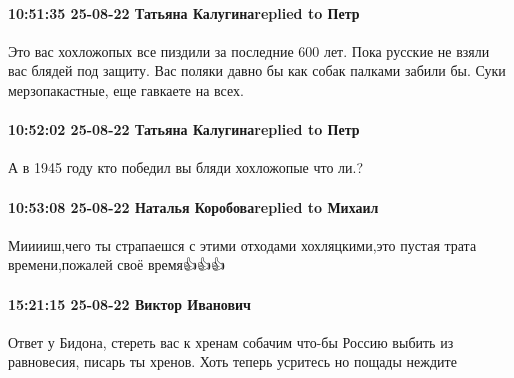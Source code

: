 \paragraph{10:51:35 25-08-22 Татьяна Калугинаreplied to Петр}

Это вас хохложопых все пиздили за последние 600 лет. Пока русские не взяли вас
блядей под защиту. Вас поляки давно бы как собак палками забили бы. Суки
мерзопакастные, еще гавкаете на всех.

\paragraph{10:52:02 25-08-22 Татьяна Калугинаreplied to Петр}

А в 1945 году кто победил вы бляди хохложопые что ли.?

\paragraph{10:53:08 25-08-22 Наталья Коробоваreplied to Михаил}

Мииииш,чего ты страпаешся с этими отходами хохляцкими,это пустая трата
времени,пожалей своё время👍👍👍

\paragraph{15:21:15 25-08-22 Виктор Иванович}

Ответ у Бидона, стереть вас к хренам собачим что-бы Россию выбить из
равновесия, писарь ты хренов. Хоть теперь усритесь но пощады неждите

